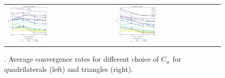 \begin{example}
\begin{figure}[h!]
	\centering
	\begin{tabular}{p{} p{}}
		\vspace{0pt}
		\includegraphics[width=0.4\textwidth]{../figs/parametric/advdiff_2D/ord_quarteroni1_2_4}
		&
		\vspace{0pt}
		\includegraphics[width=0.4\textwidth]{../figs/parametric/advdiff_2D/ord_quarteroni1_2_3}
	\end{tabular}
	\caption{. Average convergence rates for different choice of $C_w$
	for quadrilaterals (left) and triangles (right).}
	\label{fig:orders_quarteroni1}
\end{figure}



\end{example}
